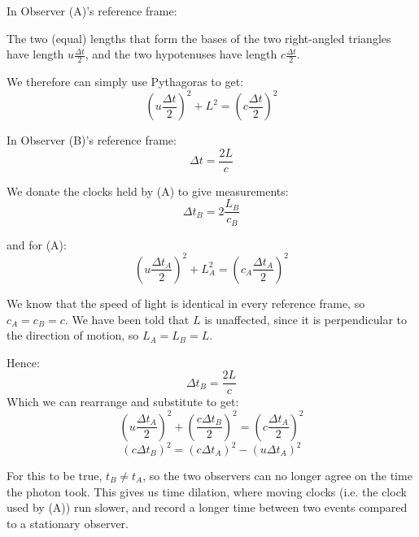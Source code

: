 In Observer (A)'s reference frame:

The two (equal) lengths that form the bases of the two right-angled triangles have length $u \frac{\Delta t}{2}$, and the two hypotenuses have length $c \frac{\Delta t}{2}$.

We therefore can simply use Pythagoras to get:
\[
    \left(u \frac{\Delta t}{2}\right)^2 + L^2 = \left(c \frac{\Delta t}{2}\right)^2
\]

In Observer (B)'s reference frame:
\[
    \Delta t = \frac{2L}{c}
\]

We donate the clocks held by (A) to give measurements:
\[
    \Delta t_B = 2 \frac{L_B}{c_B}
\]

and for (A):
\[
    \left(u \frac{\Delta t_A}{2}\right)^2 + L_A^2 = \left(c_A \frac{\Delta t_A}{2}\right)^2
\]

We know that the speed of light is identical in every reference frame, so $c_A = c_B = c$. We have been told that $L$ is unaffected, since it is perpendicular to the direction of motion, so $L_A = L_B = L$.

Hence:
\[
    \Delta t_B = \frac{2L}{c}
\]
Which we can rearrange and substitute to get:
\[
    \left(u \frac{\Delta t_A}{2}\right)^2 + \left(\frac{c \Delta t_B}{2}\right)^2 = \left(c \frac{\Delta t_A}{2}\right)^2
\]
\[
   \left({c \Delta t_B}\right)^2 = \left(c {\Delta t_A}\right)^2 -  \left(u {\Delta t_A}\right)^2
\]

For this to be true, $t_B \not = t_A$, so the two observers can no longer agree on the time the photon took. This gives us time dilation, where moving clocks (i.e. the clock used by (A)) run slower, and record a longer time between two events compared to a stationary observer.

